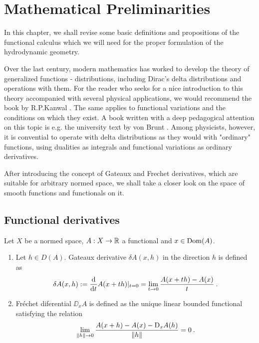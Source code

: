 \chapter{Mathematical Preliminarities}

In this chapter, we shall revise some basic definitions and propositions of the functional calculus which we will need for the proper formulation of the hydrodynamic geometry. 

Over the last century, modern mathematics has worked to develop the theory of generalized functions - distributions, including Dirac's delta distributions and operations with them. For the reader who seeks for a nice introduction to this theory accompanied with several physical applications, we would recommend the book by R.P.Kanwal \cite{Kanwal}. The same applies to functional variations and the conditions on which they exist. A book written with a deep pedagogical attention on this topic is e.g. the university text by von Brunt \cite{Brunt}.
Among physicists, however, it is convential to operate with delta distributions as they would with "ordinary" functions, using dualities as integrals and functional variations as ordinary derivatives.


After introducing the concept of Gateaux and Frechet derivatives, which are suitable for arbitrary normed space, we shall take a closer look on the space of smooth functions and functionals on it.

\section{Functional derivatives}


\begin{definition}
    Let $X$ be a normed space, $A: X \to \mathbb{R}$ a functional and $x \in \mathrm{Dom}(A)$.
    \begin{enumerate}
        \item Let $h \in D(A)$. Gateaux derivative $\delta A(x,h)$ in the direction $h$ is defined as
        \begin{align}
            \delta A (x,h) := \frac{\mathrm{d}}{\mathrm{d}t} A(x+th) |_{t=0} = \lim_{t \rightarrow 0} \frac{A(x+th)-A(x)}{t} \:.
        \end{align}

        \item Fréchet diferential $\DD_x A$ is defined as the unique linear bounded functional satisfying the relation
        \begin{align}
            \lim_{\left \Vert h \right \Vert \rightarrow 0} \frac{A(x+h)-A(x)- \mathrm{D}_x A(h)}{\left \Vert h \right \Vert} = 0 \:.
        \end{align}
    \end{enumerate}
\end{definition}

